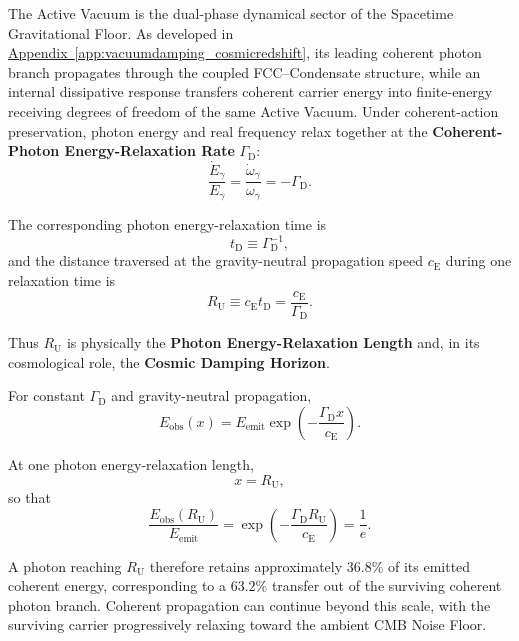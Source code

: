 The Active Vacuum is the dual-phase dynamical sector of the Spacetime Gravitational Floor. As developed in \hyperref[app:vacuumdamping_cosmicredshift]{Appendix~\ref*{app:vacuumdamping_cosmicredshift}}, its leading coherent photon branch propagates through the coupled FCC--Condensate structure, while an internal dissipative response transfers coherent carrier energy into finite-energy receiving degrees of freedom of the same Active Vacuum. Under coherent-action preservation, photon energy and real frequency relax together at the \textbf{Coherent-Photon Energy-Relaxation Rate} $\Gamma_{\mathrm D}$:
\begin{equation}
    \frac{\dot E_\gamma}{E_\gamma}
    =
    \frac{\dot\omega_\gamma}{\omega_\gamma}
    =
    -\Gamma_{\mathrm D}.
\end{equation}

The corresponding photon energy-relaxation time is
\begin{equation}
    t_{\mathrm D}
    \equiv
    \Gamma_{\mathrm D}^{-1},
\end{equation}
and the distance traversed at the gravity-neutral propagation speed $c_{\mathrm E}$ during one relaxation time is
\begin{equation}
    R_{\mathrm U}
    \equiv
    c_{\mathrm E}t_{\mathrm D}
    =
    \frac{c_{\mathrm E}}{\Gamma_{\mathrm D}}.
\end{equation}

Thus $R_{\mathrm U}$ is physically the \textbf{Photon Energy-Relaxation Length} and, in its cosmological role, the \textbf{Cosmic Damping Horizon}.

For constant $\Gamma_{\mathrm D}$ and gravity-neutral propagation,
\begin{equation}
    E_{\mathrm{obs}}(x)
    =
    E_{\mathrm{emit}}
    \exp\left(
        -\frac{\Gamma_{\mathrm D}x}{c_{\mathrm E}}
    \right).
\end{equation}

At one photon energy-relaxation length,
\begin{equation}
    x
    =
    R_{\mathrm U},
\end{equation}
so that
\begin{equation}
    \frac{
        E_{\mathrm{obs}}(R_{\mathrm U})
    }{
        E_{\mathrm{emit}}
    }
    =
    \exp\left(
        -\frac{\Gamma_{\mathrm D}R_{\mathrm U}}{c_{\mathrm E}}
    \right)
    =
    \frac{1}{e}.
\end{equation}

A photon reaching $R_{\mathrm U}$ therefore retains approximately $36.8\%$ of its emitted coherent energy, corresponding to a $63.2\%$ transfer out of the surviving coherent photon branch. Coherent propagation can continue beyond this scale, with the surviving carrier progressively relaxing toward the ambient CMB Noise Floor.

